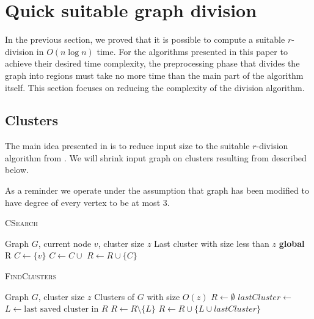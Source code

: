 \section{Quick suitable graph division}

In the previous section, we proved that it is possible to compute a suitable $r$-division in $O(n \log n)$ time. For the algorithms presented in this paper to achieve their desired time complexity, the preprocessing phase that divides the graph into regions must take no more time than the main part of the algorithm itself. This section focuses on reducing the complexity of the division algorithm.

\subsection{Clusters}

The main idea presented in \cite{frederickson} is to reduce input size to the suitable $r$-division algorithm from . We will shrink input graph on clusters resulting from  described below.

As a reminder we operate under the assumption that graph has been modified to have degree of every vertex to be at most 3.

\begin{algorithm}[H]
\caption{\textsc{CSearch} \cite{clusters} }\label{csearch}
\begin{algorithmic}[1]
\Require Graph $G$, current node $v$, cluster size $z$
\Ensure Last cluster with size less than $z$
\State \textbf{global} R 
    \State $C \gets \{v\}$
        \State $C \gets C \cup$ 
    \EndFor
        \State {}
    \Else
        \State $R \gets R \cup \{C\}$ 
        \State \Return{$\emptyset$}
    \EndIf
\EndProcedure
\end{algorithmic}
\end{algorithm}

\begin{algorithm}[H]
\caption{\textsc{FindClusters} \cite{clusters} }\label{findclusters}
\begin{algorithmic}[1]
\Require Graph $G$, cluster size $z$
\Ensure Clusters of $G$ with size $O(z)$
    \State $R \gets \emptyset$
    \State $lastCluster \gets$ 
        \State $L \gets \text{last saved cluster in } R$ 
        \State $R \gets R \setminus \{L\}$
        \State $R \gets R \cup \{ L \cup lastCluster \}$
    \EndIf
    \State {}
\EndProcedure
\end{algorithmic}
\end{algorithm}

